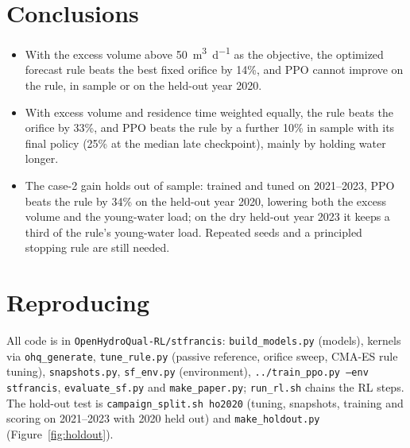 \documentclass[11pt]{article}
\begin{document}
\section{Conclusions}
\begin{itemize}
\item With the excess volume above \SI{50}{\m^3\per\day} as the objective, the optimized
forecast rule beats the best fixed orifice by 14\%, and PPO cannot improve on the rule, in
sample or on the held-out year 2020.
\item With excess volume and residence time weighted equally, the rule beats the orifice by
33\%, and PPO beats the rule by a further 10\% in sample with its final policy (25\% at
the median late checkpoint), mainly by holding water longer.
\item The case-2 gain holds out of sample: trained and tuned on 2021--2023, PPO beats the
rule by 34\% on the held-out year 2020, lowering both the excess volume and the young-water
load; on the dry held-out year 2023 it keeps a third of the rule's young-water load.
Repeated seeds and a principled stopping rule are still needed.
\end{itemize}

\appendix
\section{Reproducing}
\sloppy
All code is in \texttt{OpenHydroQual-RL/stfrancis}: \texttt{build\_models.py} (models),
kernels via \texttt{ohq\_generate}, \texttt{tune\_rule.py} (passive reference, orifice sweep,
CMA-ES rule tuning), \texttt{snapshots.py}, \texttt{sf\_env.py} (environment),
\texttt{../train\_ppo.py --env stfrancis}, \texttt{evaluate\_sf.py} and
\texttt{make\_paper.py}; \texttt{run\_rl.sh} chains the RL steps. The hold-out test is
\texttt{campaign\_split.sh ho2020} (tuning, snapshots, training and scoring on 2021--2023
with 2020 held out) and \texttt{make\_holdout.py} (Figure~\ref{fig:holdout}).
\end{document}
